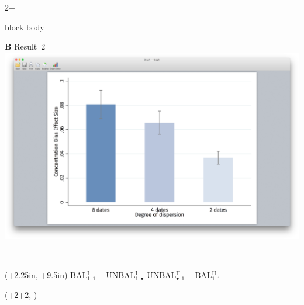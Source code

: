 \documentclass{beamer}
\newlength{\blockTwo}
\newcommand{\balA}[1][1]{BAL$^\mathup{I}_{#1:#1}$\xspace}
\newcommand{\unbalA}[1][n]{UNBAL$^\mathup{I}_{1:#1}$\xspace}
\newcommand{\balB}[1][1]{BAL$^\mathup{II}_{#1:#1}$\xspace}
\newcommand{\unbalB}[1][n]{UNBAL$^\mathup{II}_{#1:1}$\xspace}
\begin{document}
\begin{frame}[t]
\begin{textblock*}{2\colwidth+\colsep}
\begin{alertblock}
\begin{beamercolorbox}[ht=8.0in, center]{block body}
	\begin{minipage}[t]{0.46\textwidth}
		\Large\textbf{B} \textcolor{SpotColor}{\hspace{3.9in} {\firasemibold\small Result~2}} \\[15pt]
		\includegraphics[width=9.5in, trim={3.75in 1.75in 3.75in 2in}, clip]
			{1_Example_Content/Images/average_8_4_2.png}
	\end{minipage} \\[40pt]
\end{beamercolorbox}
\end{alertblock}

\end{textblock*}


\TPshowboxesfalse

\begin{textblock*}{\colwidth}(\leftmargin+2.25in, \blockTwo+9.5in)
	\centering \footnotesize \sffamily
	$\text{\balA} - \text{\unbalA[\bullet]}$
	\hspace{40pt}
	$\text{\unbalB[\bullet]} - \text{\balB}$
\end{textblock*}




\TPshowboxestrue

\begin{textblock*}{\colwidth}(\leftmargin+2\colwidth+2\colsep, \blockTwo)


\end{textblock*}
\end{frame}
\end{document}
